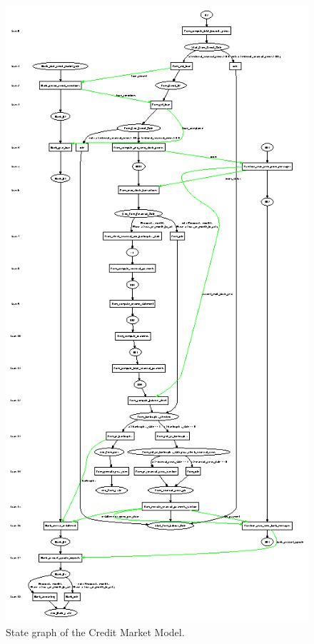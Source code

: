  \begin{figure}[!htb]
 \begin{center}
  \includegraphics*[scale=2.0]{stategraph.ps}
 \caption{State graph of the Credit Market Model.} \label{fig:statecredit}
 \end{center}
 \end{figure}


